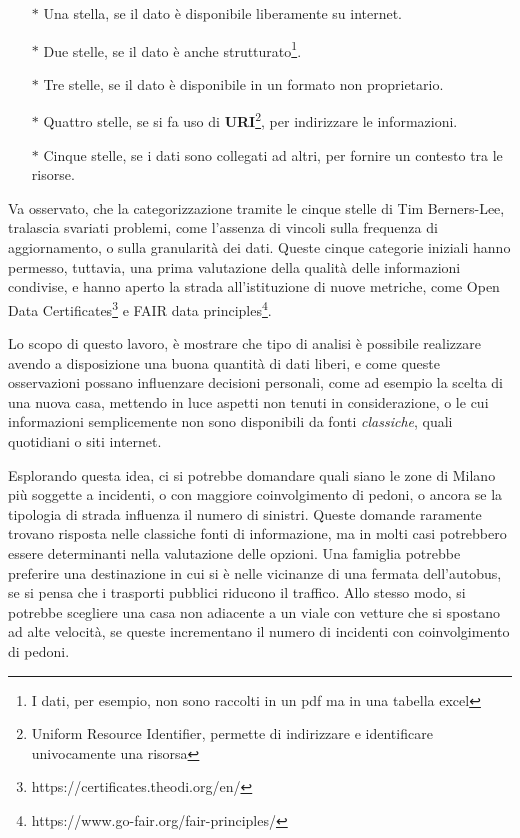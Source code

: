 \documentclass[a4paper]{report}
\newcommand{\quotestyle}[1]{\textit{#1}}
\newcommand{\engstyle}[1]{\textbf{#1}}
\newcommand{\skipline}{\vspace{0.2in}}
\begin{document}
\begin{itemize}
    \item[$\ast$] Una stella, se il dato è disponibile liberamente su internet. 
    \item[$\ast$] Due stelle, se il dato è anche strutturato\footnote{I dati, 
    per esempio, non sono raccolti in un pdf ma in una tabella excel}. 
    \item[$\ast$] Tre stelle, se il dato è disponibile in un formato non proprietario. 
    \item[$\ast$] Quattro stelle, se si fa uso 
    di \engstyle{URI}\footnote{Uniform Resource Identifier, permette di indirizzare e 
    identificare univocamente una risorsa}, per indirizzare le informazioni. 
    \item[$\ast$] Cinque stelle, se i dati sono collegati ad altri, 
    per fornire un contesto tra le risorse. 
\end{itemize}

Va osservato, che la categorizzazione tramite le cinque stelle di Tim Berners-Lee, 
tralascia svariati problemi, come l'assenza di vincoli sulla 
frequenza di aggiornamento, o sulla granularità dei dati. 
Queste cinque categorie iniziali hanno permesso, tuttavia, una prima valutazione 
della qualità delle informazioni condivise, 
e hanno aperto la strada all'istituzione di nuove metriche, come 
Open Data Certificates\footnote{https://certificates.theodi.org/en/} e FAIR data 
principles\footnote{https://www.go-fair.org/fair-principles/}. 

\skipline
Lo scopo di questo lavoro, è mostrare che tipo di analisi è possibile realizzare 
avendo a disposizione una buona quantità di dati liberi, e come queste osservazioni possano 
influenzare decisioni personali, come ad esempio la scelta di una nuova casa, 
mettendo in luce aspetti non tenuti in considerazione, o le cui informazioni semplicemente 
non sono disponibili da fonti \quotestyle{classiche}, quali quotidiani o siti internet. 

Esplorando questa idea, ci si potrebbe domandare quali siano le zone 
di Milano più soggette a incidenti, o con maggiore coinvolgimento di pedoni, 
o ancora se la tipologia di strada influenza il numero di sinistri. 
Queste domande raramente trovano risposta nelle classiche fonti di informazione, 
ma in molti casi potrebbero essere determinanti nella valutazione delle opzioni. 
Una famiglia potrebbe preferire una destinazione in cui si è nelle 
vicinanze di una fermata dell'autobus, se si pensa che i trasporti pubblici riducono 
il traffico. 
Allo stesso modo, si potrebbe scegliere una casa non adiacente 
a un viale con vetture che si spostano ad alte velocità, se queste incrementano 
il numero di incidenti con coinvolgimento di pedoni. 
\end{document}

